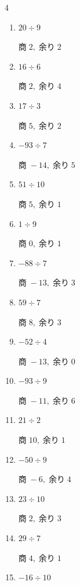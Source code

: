 \begin{multicols}{4}
\begin{enumerate}
        $商\; 8,\; 余り\; 6$

  \item $20 \div 9$

        $商\; 2,\; 余り\; 2$

  \item $16 \div 6$

        $商\; 2,\; 余り\; 4$

  \item $17 \div 3$

        $商\; 5,\; 余り\; 2$

  \item $-93 \div 7$

        $商\; -14,\; 余り\; 5$

  \item $51 \div 10$

        $商\; 5,\; 余り\; 1$

  \item $1 \div 9$

        $商\; 0,\; 余り\; 1$

  \item $-88 \div 7$

        $商\; -13,\; 余り\; 3$

  \item $59 \div 7$

        $商\; 8,\; 余り\; 3$

  \item $-52 \div 4$

        $商\; -13,\; 余り\; 0$

  \item $-93 \div 9$

        $商\; -11,\; 余り\; 6$

  \item $21 \div 2$

        $商\; 10,\; 余り\; 1$

  \item $-50 \div 9$

        $商\; -6,\; 余り\; 4$

  \item $23 \div 10$

        $商\; 2,\; 余り\; 3$

\columnbreak %

  \item $29 \div 7$

        $商\; 4,\; 余り\; 1$

  \item $-16 \div 10$


\end{enumerate}
\end{multicols}
